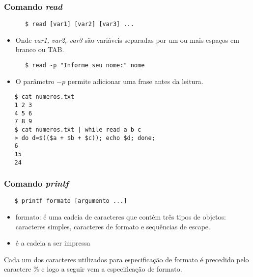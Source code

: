 \documentclass{beamer}
\begin{document}
   \begin{frame}[fragile]
      \frametitle{Comando \textit{read}}
      \begin{verbatim}
      $ read [var1] [var2] [var3] ... 
      \end{verbatim}
      \begin{itemize}
         \item Onde \textit{var1, var2, var3} são variáveis separadas por um ou mais espaços em branco ou TAB.
      \end{itemize}
      \begin{verbatim}
      $ read -p "Informe seu nome:" nome 
      \end{verbatim}
      \begin{itemize}
         \item O parâmetro $-p$ permite adicionar uma frase antes da leitura.
      \end{itemize}
\end{frame}

   \begin{frame}[fragile]
   \begin{verbatim}
   $ cat numeros.txt 
   1 2 3
   4 5 6
   7 8 9
   $ cat numeros.txt | while read a b c
   > do d=$(($a + $b + $c)); echo $d; done;
   6
   15
   24
   \end{verbatim}
\end{frame}

   \begin{frame}[fragile]
      \frametitle{Comando \textit{printf}}
      \begin{verbatim} 
   $ printf formato [argumento ...]         
      \end{verbatim}
      \begin{itemize}
         \item formato: é uma cadeia de caracteres que contém três tipos de objetos: caracteres simples, caracteres de formato e sequências de escape.
	      \item é a cadeia a ser impressa
      \end{itemize}
      Cada um dos caracteres utilizados para especificação de formato é precedido pelo caractere \% e logo a seguir vem a especificação de formato.
\end{frame}

\end{document}
